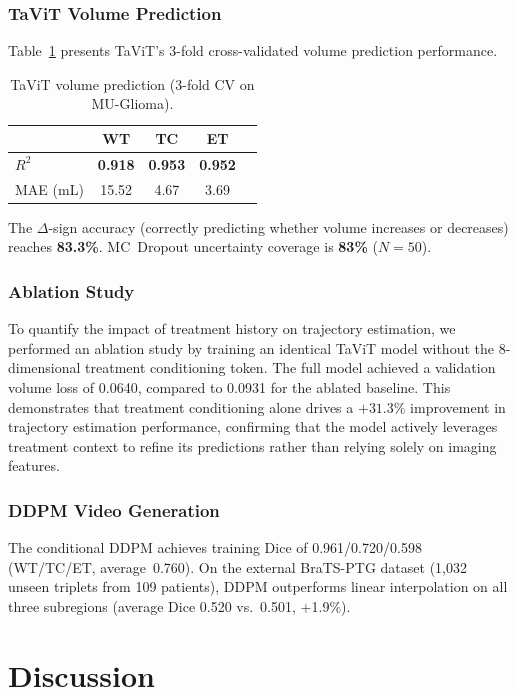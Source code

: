 \documentclass[conference]{IEEEtran}
\begin{document}
\subsubsection{TaViT Volume Prediction}
Table~\ref{tab:tavit} presents TaViT's 3-fold cross-validated volume prediction performance.

\begin{table}[h]
\centering
\caption{TaViT volume prediction (3-fold CV on MU-Glioma).}
\label{tab:tavit}
\begin{tabular}{lcccc}
\toprule
& \textbf{WT} & \textbf{TC} & \textbf{ET} \\
\midrule
$R^2$        & \textbf{0.918} & \textbf{0.953} & \textbf{0.952} \\
MAE (mL)     & 15.52 & 4.67  & 3.69 \\
\bottomrule
\end{tabular}
\end{table}

The $\Delta$-sign accuracy (correctly predicting whether volume increases or decreases) reaches \textbf{83.3\%}. MC~Dropout uncertainty coverage is \textbf{83\%} ($N=50$).

\subsubsection{Ablation Study}
To quantify the impact of treatment history on trajectory estimation, we performed an ablation study by training an identical TaViT model without the 8-dimensional treatment conditioning token. The full model achieved a validation volume loss of 0.0640, compared to 0.0931 for the ablated baseline. This demonstrates that treatment conditioning alone drives a $+31.3\%$ improvement in trajectory estimation performance, confirming that the model actively leverages treatment context to refine its predictions rather than relying solely on imaging features.


\subsubsection{DDPM Video Generation}
The conditional DDPM achieves training Dice of 0.961/0.720/0.598 (WT/TC/ET, average~0.760). On the external BraTS-PTG dataset (1,032 unseen triplets from 109 patients), DDPM outperforms linear interpolation on all three subregions (average Dice 0.520 vs.\ 0.501, $+$1.9\%).


\section{Discussion}
\label{sec:discussion}
\end{document}
